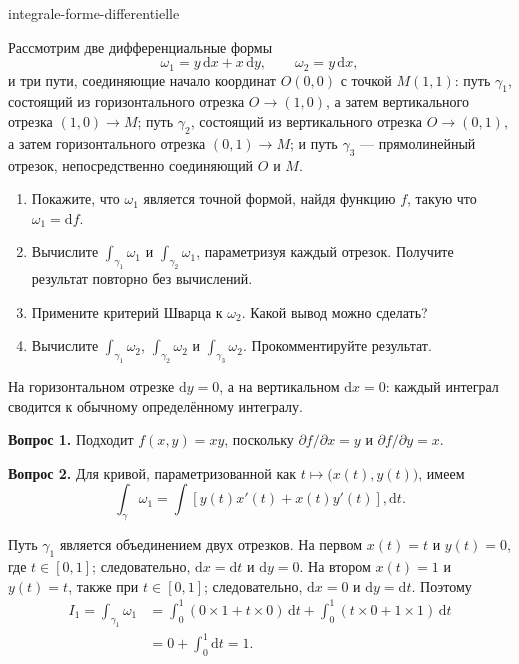 
\begin{exo}{integrale-forme-differentielle}

Рассмотрим две дифференциальные формы
\[
\omega_1 = y\,\mathrm{d}x + x\,\mathrm{d}y,
\qquad
\omega_2 = y\,\mathrm{d}x,
\]
и три пути, соединяющие начало координат $O(0,0)$ с точкой $M(1,1)$: путь
$\gamma_1$, состоящий из горизонтального отрезка $O\to(1,0)$, а затем
вертикального отрезка $(1,0)\to M$; путь $\gamma_2$, состоящий из
вертикального отрезка $O\to(0,1)$, а затем горизонтального отрезка
$(0,1)\to M$; и путь $\gamma_3$ — прямолинейный отрезок, непосредственно
соединяющий $O$ и $M$.

\begin{enumerate}
\item Покажите, что $\omega_1$ является точной формой, найдя функцию $f$, такую что $\omega_1 = \mathrm{d}f$.
\item Вычислите $\int_{\gamma_1}\omega_1$ и $\int_{\gamma_2}\omega_1$, параметризуя каждый отрезок. Получите результат повторно без вычислений.
\item Примените критерий Шварца к $\omega_2$. Какой вывод можно сделать?
\item Вычислите $\int_{\gamma_1}\omega_2$, $\int_{\gamma_2}\omega_2$ и $\int_{\gamma_3}\omega_2$. Прокомментируйте результат.
\end{enumerate}

\begin{indication}
На горизонтальном отрезке $\mathrm{d}y = 0$, а на вертикальном
$\mathrm{d}x = 0$: каждый интеграл сводится к обычному определённому интегралу.
\end{indication}

\begin{solution}
\textbf{Вопрос 1.} Подходит $f(x,y) = xy$, поскольку $\partial f/\partial x = y$ и $\partial f/\partial y = x$.

\textbf{Вопрос 2.} Для кривой, параметризованной как
$t\mapsto\bigl(x(t),y(t)\bigr)$, имеем
\[
\int_\gamma\omega_1
= \int \left[y(t)x'(t)+x(t)y'(t)\right],\mathrm{d}t.
\]

Путь $\gamma_1$ является объединением двух отрезков. На первом
$x(t)=t$ и $y(t)=0$, где $t\in[0,1]$; следовательно, $\mathrm{d}x=\mathrm{d}t$
и $\mathrm{d}y=0$. На втором $x(t)=1$ и $y(t)=t$, также при
$t\in[0,1]$; следовательно, $\mathrm{d}x=0$ и $\mathrm{d}y=\mathrm{d}t$. Поэтому
\[
\begin{aligned}
I_1
= \int_{\gamma_1}\omega_1
&= \int_0^1\left(0\times 1+t\times 0\right)\,\mathrm{d}t
 + \int_0^1\left(t\times 0+1\times 1\right)\,\mathrm{d}t \\
&= 0+\int_0^1\mathrm{d}t = 1.
\end{aligned}
\]


\end{solution}
\end{exo}
